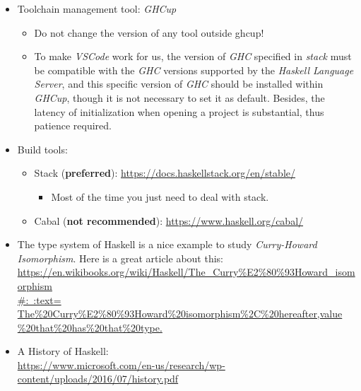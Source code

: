 \documentclass{article}
\begin{document}
\begin{itemize}
\begin{itemize}
\begin{itemize}
        \end{itemize}
        \item Toolchain management tool: \emph{GHCup}
        \begin{itemize}
            \item Do not change the version of any tool outside ghcup!
            \item To make \emph{VSCode} work for us, the version of \emph{GHC} specified in \emph{stack} must be compatible with the \emph{GHC} versions supported by the \emph{Haskell Language Server}, and this specific version of \emph{GHC} should be installed within \emph{GHCup}, though it is not necessary to set it as default.
            Besides, the latency of initialization when opening a project is substantial, thus patience required.
        \end{itemize}
        \item Build tools:
        \begin{itemize}
            \item Stack (\textbf{preferred}):
            \href{https://docs.haskellstack.org/en/stable/}{https://docs.haskellstack.org/en/stable/}
            \begin{itemize}
                \item Most of the time you just need to deal with stack.
            \end{itemize}
            \item Cabal (\textbf{not recommended}):
            \href{https://www.haskell.org/cabal/}{https://www.haskell.org/cabal/}
            
        \end{itemize}
        \item The type system of Haskell is a nice example to study \emph{Curry-Howard Isomorphism}. Here is a great article about this:\\
        \href{https://en.wikibooks.org/wiki/Haskell/The_Curry%E2%80%93Howard_isomorphism#:~:text=The%20Curry%E2%80%93Howard%20isomorphism%2C%20hereafter,value%20that%20has%20that%20type.}{https://en.wikibooks.org/wiki/Haskell/The\_Curry\%E2\%80\%93Howard\_isomorphism\\
        #:~:text=  The\%20Curry\%E2\%80\%93Howard\%20isomorphism\%2C\%20hereafter,value\\
        \%20that\%20has\%20that\%20type.}
        \item A History of Haskell:\\
        \href{https://www.microsoft.com/en-us/research/wp-content/uploads/2016/07/history.pdf}{https://www.microsoft.com/en-us/research/wp-content/uploads/2016/07/history.pdf}
        

\end{itemize}
\end{itemize}
\end{document}
